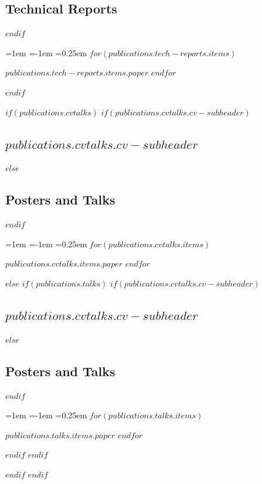 \documentclass[letterpaper,10pt,final]{moderncv}
\begin{document}
\subsection{Technical Reports}
$endif$
\vspace*{0.25em}
\begin{list}{}{\leftmargin=1em \itemindent=-1em \itemsep=0.25em}
$for(publications.tech-reports.items)$
\item $publications.tech-reports.items.paper$
$endfor$
\end{list}
$endif$

$if(publications.cvtalks)$
$if(publications.cvtalks.cv-subheader)$
\subsection{$publications.cvtalks.cv-subheader$}
$else$
\subsection{Posters and Talks}
$endif$
\vspace*{0.25em}
\begin{list}{}{\leftmargin=1em \itemindent=-1em \itemsep=0.25em}
$for(publications.cvtalks.items)$
\item $publications.cvtalks.items.paper$
$endfor$
\end{list}
$else$
$if(publications.talks)$
$if(publications.cvtalks.cv-subheader)$
\subsection{$publications.cvtalks.cv-subheader$}
$else$
\subsection{Posters and Talks}
$endif$
\vspace*{0.25em}
\begin{list}{}{\leftmargin=1em \itemindent=-1em \itemsep=0.25em}
$for(publications.talks.items)$
\item $publications.talks.items.paper$
$endfor$
\end{list}
$endif$
$endif$

$endif$
$endif$


\end{document}
